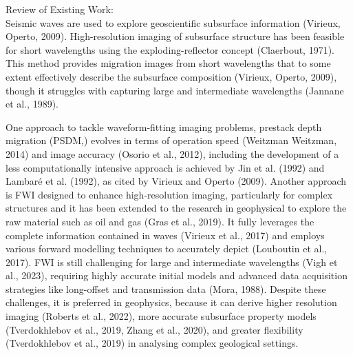 \documentclass[project-plan]{report-template}
\begin{document}
Review of Existing Work: \\
Seismic waves are used to explore geoscientific subsurface information (Virieux, Operto, 2009). High-resolution imaging of subsurface structure has been feasible for short wavelengths using the exploding-reflector concept (Claerbout, 1971). This method provides migration images from short wavelengths that to some extent effectively describe the subsurface composition (Virieux, Operto, 2009), though it struggles with capturing large and intermediate wavelengths (Jannane et al., 1989).

One approach to tackle waveform-fitting imaging problems, prestack depth migration (PSDM,) evolves in terms of operation speed (Weitzman Weitzman, 2014) and image accuracy (Osorio et al., 2012), including the development of a less computationally intensive approach is achieved by Jin et al. (1992) and Lambaré et al. (1992), as cited by Virieux and Operto (2009). Another approach is FWI designed to enhance high-resolution imaging, particularly for complex structures and it has been extended to the research in geophysical to explore the raw material such as oil and gas (Gras et al., 2019). It fully leverages the complete information contained in waves (Virieux et al., 2017) and employs various forward modelling techniques to accurately depict (Louboutin et al., 2017). FWI is still challenging for large and intermediate wavelengths (Vigh et al., 2023), requiring highly accurate initial models and advanced data acquisition strategies like long-offset and transmission data (Mora, 1988). Despite these challenges, it is preferred in geophysics, because it can derive higher resolution imaging (Roberts et al., 2022), more accurate subsurface property models (Tverdokhlebov et al., 2019, Zhang et al., 2020), and greater flexibility (Tverdokhlebov et al., 2019) in analysing complex geological settings. 
\end{document}
